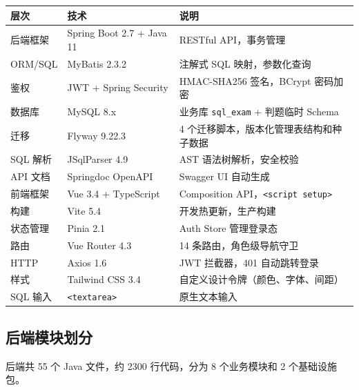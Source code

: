 \documentclass[12pt,a4paper]{ctexart}
\begin{document}
\begin{table}[h]
\centering
\begin{tabular}{lll}
\hline
层次 & 技术 & 说明 \\
\hline
后端框架 & Spring Boot 2.7 + Java 11 & RESTful API，事务管理 \\
ORM/SQL  & MyBatis 2.3.2 & 注解式 SQL 映射，参数化查询 \\
鉴权     & JWT + Spring Security & HMAC-SHA256 签名，BCrypt 密码加密 \\
数据库   & MySQL 8.x & 业务库 \texttt{sql\_exam} + 判题临时 Schema \\
迁移     & Flyway 9.22.3 & 4 个迁移脚本，版本化管理表结构和种子数据 \\
SQL 解析 & JSqlParser 4.9 & AST 语法树解析，安全校验 \\
API 文档 & Springdoc OpenAPI & Swagger UI 自动生成 \\
\hline
前端框架 & Vue 3.4 + TypeScript & Composition API，\texttt{<script setup>} \\
构建     & Vite 5.4 & 开发热更新，生产构建 \\
状态管理 & Pinia 2.1 & Auth Store 管理登录态 \\
路由     & Vue Router 4.3 & 14 条路由，角色级导航守卫 \\
HTTP     & Axios 1.6 & JWT 拦截器，401 自动跳转登录 \\
样式     & Tailwind CSS 3.4 & 自定义设计令牌（颜色、字体、间距） \\
SQL 输入 & \texttt{<textarea>} & 原生文本输入 \\
\hline
\end{tabular}
\end{table}

\subsection{后端模块划分}

后端共 55 个 Java 文件，约 2300 行代码，分为 8 个业务模块和 2 个基础设施包。
\end{document}
